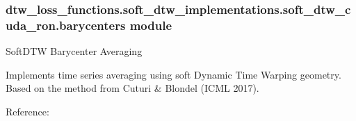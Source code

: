 \documentclass[letterpaper,10pt,english]{sphinxmanual}
\begin{document}
\subsubsection{dtw\_loss\_functions.soft\_dtw\_implementations.soft\_dtw\_cuda\_ron.barycenters module}
\label{\detokenize{dtw_loss_functions.soft_dtw_implementations.soft_dtw_cuda_ron.barycenters:module-dtw_loss_functions.soft_dtw_implementations.soft_dtw_cuda_ron.barycenters}}\label{\detokenize{dtw_loss_functions.soft_dtw_implementations.soft_dtw_cuda_ron.barycenters:dtw-loss-functions-soft-dtw-implementations-soft-dtw-cuda-ron-barycenters-module}}\label{\detokenize{dtw_loss_functions.soft_dtw_implementations.soft_dtw_cuda_ron.barycenters::doc}}
\sphinxAtStartPar
SoftDTW Barycenter Averaging

\sphinxAtStartPar
Implements time series averaging using soft Dynamic Time Warping geometry.
Based on the method from Cuturi \& Blondel (ICML 2017).

\sphinxAtStartPar
Reference: 
\end{document}
